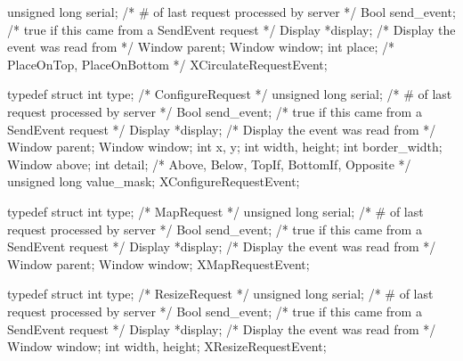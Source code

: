 \documentclass{report}
\begin{document}
\begin{itemize}
\begin{cppcode}
{                    unsigned long serial;       /* # of last request processed by server */
                    Bool send_event;            /* true if this came from a SendEvent request */
                    Display *display;           /* Display the event was read from */
                    Window parent;
                    Window window;
                    int place;                  /* PlaceOnTop, PlaceOnBottom */
                } XCirculateRequestEvent;
            \end{cppcode}
            \begin{cppcode}
                typedef struct {
                    int type;                   /* ConfigureRequest */
                    unsigned long serial;       /* # of last request processed by server */
                    Bool send_event;            /* true if this came from a SendEvent request */
                    Display *display;           /* Display the event was read from */
                    Window parent;
                    Window window;
                    int x, y;
                    int width, height;
                    int border_width;
                    Window above;
                    int detail; /* Above, Below, TopIf, BottomIf, Opposite */
                    unsigned long value_mask;
                } XConfigureRequestEvent;
            \end{cppcode}
            \begin{cppcode}
                typedef struct {
                    int type; /* MapRequest */
                    unsigned long serial; /* # of last request processed by server */
                    Bool send_event; /* true if this came from a SendEvent request */
                    Display *display; /* Display the event was read from */
                    Window parent;
                    Window window;
                } XMapRequestEvent;
            \end{cppcode}
            \begin{cppcode}
                typedef struct {
                    int type;                   /* ResizeRequest */
                    unsigned long serial;       /* # of last request processed by server */
                    Bool send_event;            /* true if this came from a SendEvent request */
                    Display *display;           /* Display the event was read from */
                    Window window;
                    int width, height;
                } XResizeRequestEvent;
            \end{cppcode}

\end{itemize}
\end{document}
